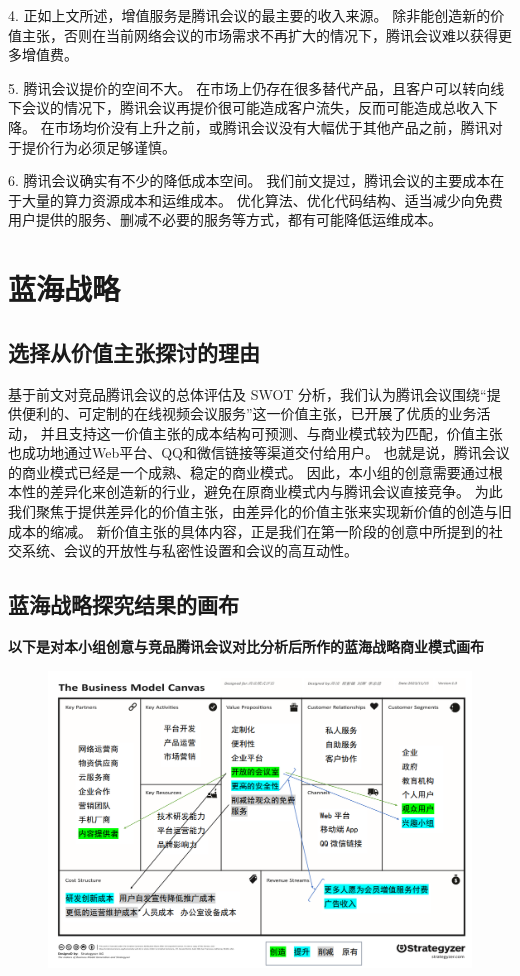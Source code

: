 \documentclass[a4paper,12pt]{article}
\begin{document}
    4.
    正如上文所述，增值服务是腾讯会议的最主要的收入来源。
    除非能创造新的价值主张，否则在当前网络会议的市场需求不再扩大的情况下，腾讯会议难以获得更多增值费。

    5.
    腾讯会议提价的空间不大。
    在市场上仍存在很多替代产品，且客户可以转向线下会议的情况下，腾讯会议再提价很可能造成客户流失，反而可能造成总收入下降。
    在市场均价没有上升之前，或腾讯会议没有大幅优于其他产品之前，腾讯对于提价行为必须足够谨慎。

    6.
    腾讯会议确实有不少的降低成本空间。
    我们前文提过，腾讯会议的主要成本在于大量的算力资源成本和运维成本。
    优化算法、优化代码结构、适当减少向免费用户提供的服务、删减不必要的服务等方式，都有可能降低运维成本。

    
    \section{蓝海战略}

    
    \subsection{选择从价值主张探讨的理由}
    基于前文对竞品腾讯会议的总体评估及 SWOT 分析，我们认为腾讯会议围绕“提供便利的、可定制的在线视频会议服务”这一价值主张，已开展了优质的业务活动，
    并且支持这一价值主张的成本结构可预测、与商业模式较为匹配，价值主张也成功地通过Web平台、QQ和微信链接等渠道交付给用户。
    也就是说，腾讯会议的商业模式已经是一个成熟、稳定的商业模式。
    因此，本小组的创意需要通过根本性的差异化来创造新的行业，避免在原商业模式内与腾讯会议直接竞争。
    为此我们聚焦于提供差异化的价值主张，由差异化的价值主张来实现新价值的创造与旧成本的缩减。
    新价值主张的具体内容，正是我们在第一阶段的创意中所提到的社交系统、会议的开放性与私密性设置和会议的高互动性。
    
    \subsection{蓝海战略探究结果的画布}
    \textbf{以下是对本小组创意与竞品腾讯会议对比分析后所作的蓝海战略商业模式画布}
    \clearpage
    \begin{figure}[htbp]
        \centering
        \includegraphics[scale=0.4]{png/蓝海战略}
        \caption{}
    \end{figure}
\end{document}
